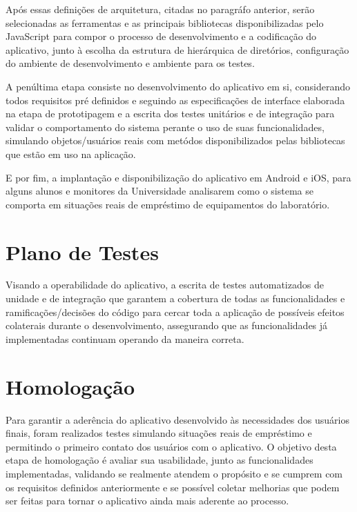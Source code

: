     Após essas definições de arquitetura, citadas no paragráfo anterior, serão selecionadas as ferramentas e as principais bibliotecas disponibilizadas pelo JavaScript para compor o processo de desenvolvimento e a codificação do aplicativo, junto à escolha da estrutura de hierárquica de diretórios, configuração do ambiente de desenvolvimento e ambiente para os testes.
    
    A penúltima etapa consiste no desenvolvimento do aplicativo em si, considerando todos requisitos pré definidos e seguindo as especificações de interface elaborada na etapa de prototipagem e a escrita dos testes unitários e de integração para validar o comportamento do sistema perante o uso de suas funcionalidades, simulando objetos/usuários reais com metódos disponibilizados pelas bibliotecas que estão em uso na aplicação.
    
    E por fim, a implantação e disponibilização do aplicativo em Android e iOS, para alguns alunos e monitores da Universidade analisarem como o sistema se comporta em situações reais de empréstimo de equipamentos do laboratório. %
    
  
    \section{Plano de Testes}
    
    Visando a operabilidade do aplicativo, a escrita de testes automatizados de unidade e de integração que garantem a cobertura de todas as funcionalidades e ramificações/decisões do código para cercar toda a aplicação de possíveis efeitos colaterais durante o desenvolvimento, assegurando que as funcionalidades já implementadas continuam operando da maneira correta.
      
    \section{Homologação}
    
    Para garantir a aderência do aplicativo desenvolvido às necessidades dos usuários finais, foram realizados testes simulando situações reais de empréstimo e permitindo o primeiro contato dos usuários com o aplicativo. O objetivo desta etapa de homologação é avaliar sua usabilidade, junto as funcionalidades implementadas, validando se realmente atendem o propósito e se cumprem com os requisitos definidos anteriormente e se possível coletar melhorias que podem ser feitas para tornar o aplicativo ainda mais aderente ao processo.
